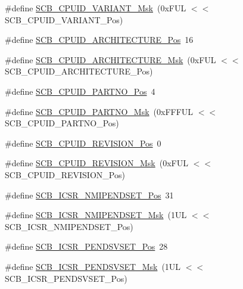 \begin{DoxyCompactItemize}
\#define \hyperlink{group___c_m_s_i_s___s_c_b_gad358dfbd04300afc1824329d128b99e8}{S\+C\+B\+\_\+\+C\+P\+U\+I\+D\+\_\+\+V\+A\+R\+I\+A\+N\+T\+\_\+\+Msk}~(0x\+F\+U\+L $<$$<$ S\+C\+B\+\_\+\+C\+P\+U\+I\+D\+\_\+\+V\+A\+R\+I\+A\+N\+T\+\_\+\+Pos)
\item 
\#define \hyperlink{group___c_m_s_i_s___s_c_b_gaf8b3236b08fb8e840efb682645fb0e98}{S\+C\+B\+\_\+\+C\+P\+U\+I\+D\+\_\+\+A\+R\+C\+H\+I\+T\+E\+C\+T\+U\+R\+E\+\_\+\+Pos}~16
\item 
\#define \hyperlink{group___c_m_s_i_s___s_c_b_gafae4a1f27a927338ae9dc51a0e146213}{S\+C\+B\+\_\+\+C\+P\+U\+I\+D\+\_\+\+A\+R\+C\+H\+I\+T\+E\+C\+T\+U\+R\+E\+\_\+\+Msk}~(0x\+F\+U\+L $<$$<$ S\+C\+B\+\_\+\+C\+P\+U\+I\+D\+\_\+\+A\+R\+C\+H\+I\+T\+E\+C\+T\+U\+R\+E\+\_\+\+Pos)
\item 
\#define \hyperlink{group___c_m_s_i_s___s_c_b_ga705f68eaa9afb042ca2407dc4e4629ac}{S\+C\+B\+\_\+\+C\+P\+U\+I\+D\+\_\+\+P\+A\+R\+T\+N\+O\+\_\+\+Pos}~4
\item 
\#define \hyperlink{group___c_m_s_i_s___s_c_b_ga98e581423ca016680c238c469aba546d}{S\+C\+B\+\_\+\+C\+P\+U\+I\+D\+\_\+\+P\+A\+R\+T\+N\+O\+\_\+\+Msk}~(0x\+F\+F\+F\+U\+L $<$$<$ S\+C\+B\+\_\+\+C\+P\+U\+I\+D\+\_\+\+P\+A\+R\+T\+N\+O\+\_\+\+Pos)
\item 
\#define \hyperlink{group___c_m_s_i_s___s_c_b_ga3c3d9071e574de11fb27ba57034838b1}{S\+C\+B\+\_\+\+C\+P\+U\+I\+D\+\_\+\+R\+E\+V\+I\+S\+I\+O\+N\+\_\+\+Pos}~0
\item 
\#define \hyperlink{group___c_m_s_i_s___s_c_b_ga2ec0448b6483f77e7f5d08b4b81d85df}{S\+C\+B\+\_\+\+C\+P\+U\+I\+D\+\_\+\+R\+E\+V\+I\+S\+I\+O\+N\+\_\+\+Msk}~(0x\+F\+U\+L $<$$<$ S\+C\+B\+\_\+\+C\+P\+U\+I\+D\+\_\+\+R\+E\+V\+I\+S\+I\+O\+N\+\_\+\+Pos)
\item 
\#define \hyperlink{group___c_m_s_i_s___s_c_b_ga750d4b52624a46d71356db4ea769573b}{S\+C\+B\+\_\+\+I\+C\+S\+R\+\_\+\+N\+M\+I\+P\+E\+N\+D\+S\+E\+T\+\_\+\+Pos}~31
\item 
\#define \hyperlink{group___c_m_s_i_s___s_c_b_ga340e3f79e9c3607dee9f2c048b6b22e8}{S\+C\+B\+\_\+\+I\+C\+S\+R\+\_\+\+N\+M\+I\+P\+E\+N\+D\+S\+E\+T\+\_\+\+Msk}~(1\+U\+L $<$$<$ S\+C\+B\+\_\+\+I\+C\+S\+R\+\_\+\+N\+M\+I\+P\+E\+N\+D\+S\+E\+T\+\_\+\+Pos)
\item 
\#define \hyperlink{group___c_m_s_i_s___s_c_b_gab5ded23d2ab1d5ff7cc7ce746205e9fe}{S\+C\+B\+\_\+\+I\+C\+S\+R\+\_\+\+P\+E\+N\+D\+S\+V\+S\+E\+T\+\_\+\+Pos}~28
\item 
\#define \hyperlink{group___c_m_s_i_s___s_c_b_ga1e40d93efb402763c8c00ddcc56724ff}{S\+C\+B\+\_\+\+I\+C\+S\+R\+\_\+\+P\+E\+N\+D\+S\+V\+S\+E\+T\+\_\+\+Msk}~(1\+U\+L $<$$<$ S\+C\+B\+\_\+\+I\+C\+S\+R\+\_\+\+P\+E\+N\+D\+S\+V\+S\+E\+T\+\_\+\+Pos)

\end{DoxyCompactItemize}
